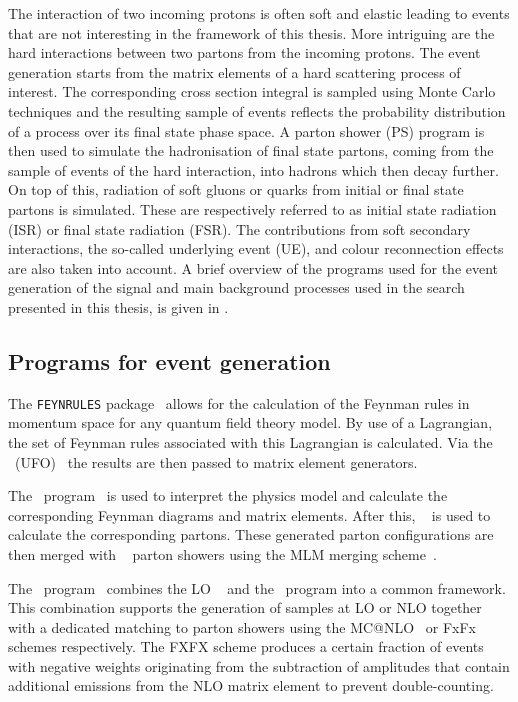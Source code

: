 The interaction of two incoming protons is often soft and elastic leading to events that are not interesting in the framework of this thesis. More intriguing are the hard interactions between two partons from the incoming protons. The event generation starts from the matrix elements of a hard scattering process of interest. The corresponding cross section integral is sampled using Monte Carlo techniques and the resulting sample of events reflects the probability distribution of a process over its final state phase space. A parton shower (PS) program is then used to simulate the hadronisation of final state partons,  coming from the sample of events of the hard interaction, into hadrons which then decay further. On top of this,  radiation of soft gluons or quarks from initial or final state partons is simulated. These are respectively referred to as initial state radiation (ISR) or final state radiation (FSR). The contributions from soft secondary interactions, the so-called underlying event (UE), and colour reconnection effects are also taken into account. 
A brief overview of the programs used for the event generation of the signal and main background processes used in the search presented in this thesis,  is given in .

\subsection{Programs for event generation}
\label{sec:programs}
The \texttt{FEYNRULES} package~\cite{Alloul:2013bka} allows for the calculation of  the Feynman rules in momentum space for any quantum field theory model. By use of a Lagrangian, the set of Feynman rules associated with this Lagrangian is calculated. Via the \UFO\ (UFO)~\cite{Degrande:2011ua} the results are then passed to matrix element generators. 


The \MG\  program~\cite{Alwall:2011uj} is used to interpret the physics model and calculate the corresponding Feynman diagrams and matrix elements. After this, \ME~\cite{Mangano:2006rw} is used to calculate the corresponding partons. These generated parton configurations are then merged with \Pythia~\cite{Sjostrand2015159,Sjostrand:2006za,Sjostrand:2014zea} parton showers using the MLM merging scheme~\cite{Alwall:2007fs}. 

The \aMCMG\ program~\cite{Alwall:2014hca} combines the LO \MG~\cite{Alwall:2011uj} and the \aMC\ program into a common framework. This combination supports the generation of samples at LO or NLO together with a dedicated matching to parton showers  using the MC@NLO~\cite{Frixione:2002ik} or FxFx~\cite{Frederix:2012ps} schemes respectively. The FXFX scheme produces a certain fraction of events with negative weights originating from the subtraction of amplitudes that contain additional emissions from the NLO matrix element to prevent double-counting.



